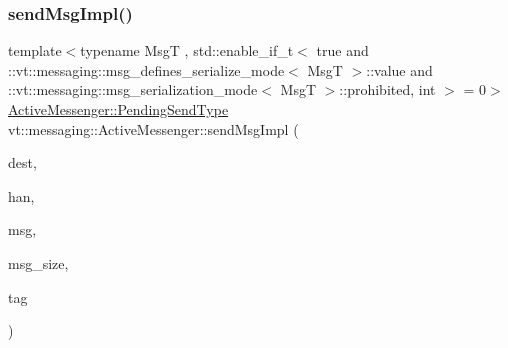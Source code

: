 \subsubsection{\texorpdfstring{send\+Msg\+Impl()}{sendMsgImpl()}\hspace{0.1cm}{\footnotesize\ttfamily [4/4]}}
{\footnotesize\ttfamily template$<$typename MsgT , std\+::enable\+\_\+if\+\_\+t$<$ true and \+::vt\+::messaging\+::msg\+\_\+defines\+\_\+serialize\+\_\+mode$<$ Msg\+T $>$\+::value and \+::vt\+::messaging\+::msg\+\_\+serialization\+\_\+mode$<$ Msg\+T $>$\+::prohibited, int $>$  = 0$>$ \\
\hyperlink{structvt_1_1messaging_1_1_active_messenger_a3626a6ca76d8ad4ec7c3b47a2c70d3a8}{Active\+Messenger\+::\+Pending\+Send\+Type} vt\+::messaging\+::\+Active\+Messenger\+::send\+Msg\+Impl (\begin{DoxyParamCaption}\item[{\hyperlink{namespacevt_a866da9d0efc19c0a1ce79e9e492f47e2}{Node\+Type}}]{dest,  }\item[{\hyperlink{namespacevt_af64846b57dfcaf104da3ef6967917573}{Handler\+Type}}]{han,  }\item[{\hyperlink{structvt_1_1messaging_1_1_msg_shared_ptr}{Msg\+Shared\+Ptr}$<$ MsgT $>$ \&}]{msg,  }\item[{\hyperlink{namespacevt_aab8d55968084610ce3b17057981e9300}{Byte\+Type}}]{msg\+\_\+size,  }\item[{\hyperlink{namespacevt_a84ab281dae04a52a4b243d6bf62d0e52}{Tag\+Type}}]{tag }\end{DoxyParamCaption})\hspace{0.3cm}{\ttfamily [inline]}}

\mbox{\label{structvt_1_1messaging_1_1_active_messenger_a957903699d6ab76b0cf39833c777772e}} 
